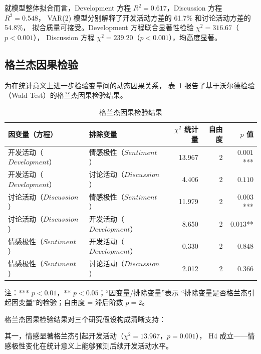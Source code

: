 就模型整体拟合而言，Development 方程 $R^2 = 0.617$，Discussion 方程 $R^2 = 0.548$，
VAR(2) 模型分别解释了开发活动方差的 61.7\% 和讨论活动方差的 54.8\%，
拟合质量可接受。Development 方程联合显著性检验 $\chi^2 = 316.67$（$p < 0.001$），
Discussion 方程 $\chi^2 = 239.20$（$p < 0.001$），均高度显著。

\subsection{格兰杰因果检验}

为在统计意义上进一步检验变量间的动态因果关系，
表~\ref{tab:granger} 报告了基于沃尔德检验（Wald Test）的格兰杰因果检验结果。

\begin{table}[htbp]
    \centering
    \caption{格兰杰因果检验结果}
    \label{tab:granger}
    \begin{tabularx}{\textwidth}{p{3.5cm}Xrrr}
        \toprule
        因变量（方程） & 排除变量 & $\chi^2$ 统计量 & 自由度 & $p$ 值 \\
        \midrule
        开发活动（$Development$）     & 情感极性（$Sentiment$） & 13.967 & 2 & $0.001$*** \\
        开发活动（$Development$）     & 讨论活动（$Discussion$）   & 4.406  & 2 & $0.110$ \\
        讨论活动（$Discussion$）  & 情感极性（$Sentiment$） & 11.979 & 2 & $0.003$*** \\
        讨论活动（$Discussion$）  & 开发活动（$Development$）      & 8.650  & 2 & $0.013$** \\
        情感极性（$Sentiment$） & 开发活动（$Development$）      & 0.330  & 2 & $0.848$ \\
        情感极性（$Sentiment$） & 讨论活动（$Discussion$）   & 2.012  & 2 & $0.366$ \\
        \bottomrule
    \end{tabularx}
    \begin{minipage}{\textwidth}
        \vspace{0.3em}
        \footnotesize 注：*** $p < 0.01$，** $p < 0.05$；“因变量/排除变量”表示
              “排除变量是否格兰杰引起因变量”的检验；自由度 = 滞后阶数 $p = 2$。
    \end{minipage}
\end{table}

格兰杰因果检验结果对三个研究假设构成清晰支持：

其一，情感显著格兰杰引起开发活动（$\chi^2 = 13.967$，$p = 0.001$），
H4 成立——情感极性变化在统计意义上能够预测后续开发活动水平。

